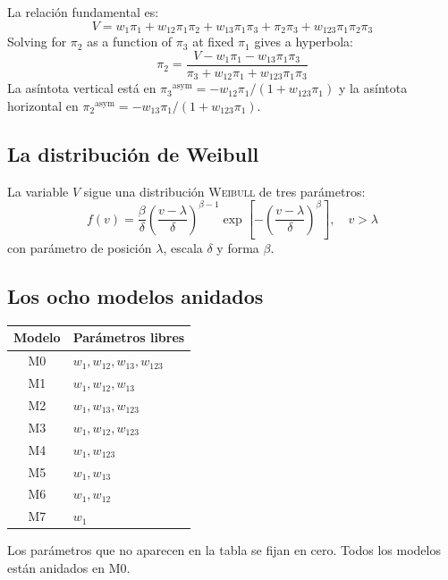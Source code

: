 \documentclass[11pt,a4paper]{article}
\newcommand{\piz}{\ensuremath{\pi_3}}
\newcommand{\pit}{\ensuremath{\pi_2}}
\newcommand{\pio}{\ensuremath{\pi_1}}
\newcommand{\Weibull}{\textsc{Weibull}}
\begin{document}
La relación fundamental es:
\begin{equation}
  V = w_1\pio + w_{12}\pio\pit + w_{13}\pio\piz + \pit\piz + w_{123}\pio\pit\piz
  \label{eq:V}
\end{equation}
Solving for $\pit$ as a function of $\piz$ at fixed $\pio$ gives a hyperbola:
\begin{equation}
  \pit = \frac{V - w_1\pio - w_{13}\pio\piz}{\piz + w_{12}\pio + w_{123}\pio\piz}
\end{equation}
La asíntota vertical está en $\piz^{\text{asym}} = -w_{12}\pio/(1+w_{123}\pio)$ y la asíntota horizontal en $\pit^{\text{asym}} = -w_{13}\pio/(1+w_{123}\pio)$.

\subsection{La distribución de Weibull}

La variable $V$ sigue una distribución \Weibull{} de tres parámetros:
\begin{equation}
  f(v) = \frac{\beta}{\delta}\left(\frac{v-\lambda}{\delta}\right)^{\beta-1}
         \exp\!\left[-\left(\frac{v-\lambda}{\delta}\right)^{\beta}\right], \quad v > \lambda
\end{equation}
con parámetro de posición $\lambda$, escala $\delta$ y forma $\beta$.

\subsection{Los ocho modelos anidados}

\begin{center}
\begin{tabular}{cl}
\toprule
\textbf{Modelo} & \textbf{Parámetros libres} \\
\midrule
M0 & $w_1, w_{12}, w_{13}, w_{123}$ \\
M1 & $w_1, w_{12}, w_{13}$ \\
M2 & $w_1, w_{13}, w_{123}$ \\
M3 & $w_1, w_{12}, w_{123}$ \\
M4 & $w_1, w_{123}$ \\
M5 & $w_1, w_{13}$ \\
M6 & $w_1, w_{12}$ \\
M7 & $w_1$ \\
\bottomrule
\end{tabular}
\end{center}

Los parámetros que no aparecen en la tabla se fijan en cero. Todos los modelos están anidados en M0.
\end{document}
